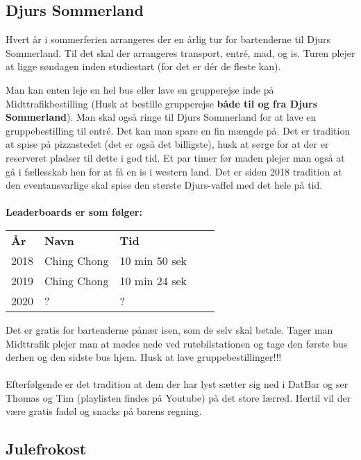 \subsection*{Djurs Sommerland}
\label{sec:djurs-sommerland}

Hvert år i sommerferien arrangeres der en årlig tur for bartenderne
til Djurs Sommerland. Til det skal der arrangeres transport, entré, mad, og is. Turen plejer at ligge søndagen inden studiestart (for det er dér de fleste kan).

Man kan enten leje en hel bus eller lave en grupperejse inde på Midttrafikbestilling (Husk at bestille grupperejse \textbf{både til og fra Djurs Sommerland}). Man skal også ringe til Djurs Sommerland for at lave en gruppebestilling til entré. Det kan man spare en fin mængde på. Det er tradition at spise på pizzastedet (det er også det billigste), husk at sørge for at der er reserveret pladser til dette i god tid. Et par timer før maden plejer man også at gå i fællesskab hen for at få en is i western land. Det er siden 2018 tradition at den eventansvarlige skal spise den største Djurs-vaffel med det hele på tid.
\\ \\
\textbf{Leaderboards er som følger:}
\begin{table}[h]
\begin{tabular}{|l|l|l|ll}
\cline{1-3}
\textbf{År} & \textbf{Navn} & \textbf{Tid}  &  &  \\ \cline{1-3}
2018        & Ching Chong   & 10 min 50 sek &  &  \\ \cline{1-3}
2019        & Ching Chong   & 10 min 24 sek &  &  \\ \cline{1-3}
2020        & ?             & ?             &  &  \\ \cline{1-3}
\end{tabular}
\end{table}

Det er gratis for bartenderne pånær isen, som de selv skal betale. Tager man Midttrafik plejer man at mødes nede ved rutebilstationen og tage den første bus derhen og den sidste bus hjem. Husk at lave gruppebestillinger!!!
\\ \\
Efterfølgende er det tradition at dem der har lyst sætter sig ned i DatBar og ser Thomas og Tim (playlisten findes på Youtube) på det store lærred. Hertil vil der være gratis fadøl og snacks på barens regning.

\subsection*{Julefrokost}
\label{sec:julefrokost}

